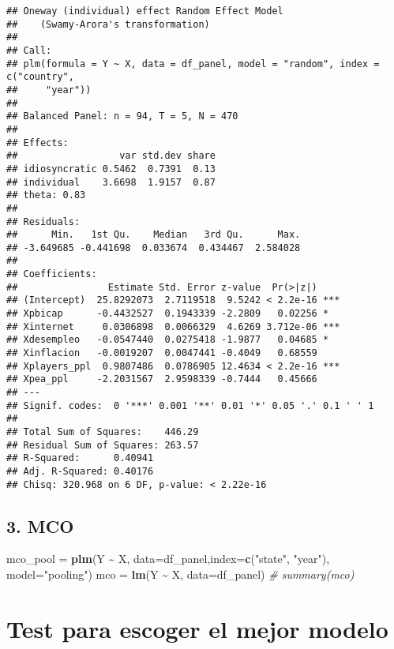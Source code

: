 \documentclass[
]{article}
\newenvironment{Shaded}{\begin{snugshade}}{\end{snugshade}}
\newcommand{\AttributeTok}[1]{\textcolor[rgb]{0.13,0.29,0.53}{#1}}
\newcommand{\CommentTok}[1]{\textcolor[rgb]{0.56,0.35,0.01}{\textit{#1}}}
\newcommand{\FunctionTok}[1]{\textcolor[rgb]{0.13,0.29,0.53}{\textbf{#1}}}
\newcommand{\NormalTok}[1]{#1}
\newcommand{\OtherTok}[1]{\textcolor[rgb]{0.56,0.35,0.01}{#1}}
\newcommand{\SpecialCharTok}[1]{\textcolor[rgb]{0.81,0.36,0.00}{\textbf{#1}}}
\newcommand{\StringTok}[1]{\textcolor[rgb]{0.31,0.60,0.02}{#1}}
\begin{document}
\begin{verbatim}
## Oneway (individual) effect Random Effect Model 
##    (Swamy-Arora's transformation)
## 
## Call:
## plm(formula = Y ~ X, data = df_panel, model = "random", index = c("country", 
##     "year"))
## 
## Balanced Panel: n = 94, T = 5, N = 470
## 
## Effects:
##                  var std.dev share
## idiosyncratic 0.5462  0.7391  0.13
## individual    3.6698  1.9157  0.87
## theta: 0.83
## 
## Residuals:
##      Min.   1st Qu.    Median   3rd Qu.      Max. 
## -3.649685 -0.441698  0.033674  0.434467  2.584028 
## 
## Coefficients:
##                Estimate Std. Error z-value  Pr(>|z|)    
## (Intercept)  25.8292073  2.7119518  9.5242 < 2.2e-16 ***
## Xpbicap      -0.4432527  0.1943339 -2.2809   0.02256 *  
## Xinternet     0.0306898  0.0066329  4.6269 3.712e-06 ***
## Xdesempleo   -0.0547440  0.0275418 -1.9877   0.04685 *  
## Xinflacion   -0.0019207  0.0047441 -0.4049   0.68559    
## Xplayers_ppl  0.9807486  0.0786905 12.4634 < 2.2e-16 ***
## Xpea_ppl     -2.2031567  2.9598339 -0.7444   0.45666    
## ---
## Signif. codes:  0 '***' 0.001 '**' 0.01 '*' 0.05 '.' 0.1 ' ' 1
## 
## Total Sum of Squares:    446.29
## Residual Sum of Squares: 263.57
## R-Squared:      0.40941
## Adj. R-Squared: 0.40176
## Chisq: 320.968 on 6 DF, p-value: < 2.22e-16
\end{verbatim}

\subsection{3. MCO}\label{mco}

\begin{Shaded}
\begin{Highlighting}[]
\NormalTok{mco\_pool }\OtherTok{=} \FunctionTok{plm}\NormalTok{(Y }\SpecialCharTok{\textasciitilde{}}\NormalTok{ X, }\AttributeTok{data=}\NormalTok{df\_panel,}\AttributeTok{index=}\FunctionTok{c}\NormalTok{(}\StringTok{"state"}\NormalTok{, }\StringTok{"year"}\NormalTok{), }\AttributeTok{model=}\StringTok{"pooling"}\NormalTok{)}
\NormalTok{mco }\OtherTok{=} \FunctionTok{lm}\NormalTok{(Y }\SpecialCharTok{\textasciitilde{}}\NormalTok{ X, }\AttributeTok{data=}\NormalTok{df\_panel)}
\CommentTok{\# summary(mco)}
\end{Highlighting}
\end{Shaded}

\section{Test para escoger el mejor
modelo}\label{test-para-escoger-el-mejor-modelo}
\end{document}
